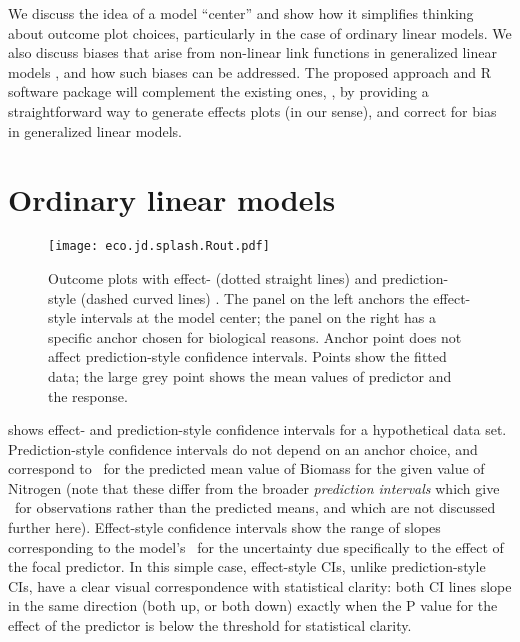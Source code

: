 We discuss the idea of a model “center” and show how it simplifies thinking about outcome plot choices, particularly in the case of ordinary linear models. We also discuss biases that arise from non-linear link functions in generalized linear models \citep{duursma_bias_2003,duursma2003bias,hanmer2013behind}, and how such biases can be addressed. The proposed approach and R software package will complement the existing ones, \citep{fox2009effect, leeper2017package, lenth2018package,marginaleffects2023package}, by providing a straightforward way to generate effects plots (in our sense), and correct for bias in generalized linear models.


\section{Ordinary linear models}

\begin{figure}
\begin{center}
\texttt{[image: eco.jd.splash.Rout.pdf]}
\end{center}
\caption{Outcome plots with effect- (dotted straight lines) and prediction-style (dashed curved lines) \CIs. The panel on the left anchors the effect-style intervals at the model center; the panel on the right has a specific anchor chosen for biological reasons. Anchor point does not affect prediction-style confidence intervals. Points show the fitted data; the large grey point shows the mean values of predictor and the response.}
\end{figure}

 shows effect- and prediction-style confidence intervals for a hypothetical data set. Prediction-style confidence intervals do not depend on an anchor choice, and correspond to \CIs\ for the predicted mean value of Biomass for the given value of Nitrogen (note that these differ from the broader \emph{prediction intervals} which give \CIs\ for observations rather than the predicted means, and which are not discussed further here). Effect-style confidence intervals show the range of slopes corresponding to the model's \CIs\ for the uncertainty due specifically to the effect of the focal predictor. In this simple case, effect-style CIs, unlike prediction-style CIs, have a clear visual correspondence with statistical clarity: both CI lines slope in the same direction (both up, or both down) exactly when the P value for the effect of the predictor is below the threshold for statistical clarity.

